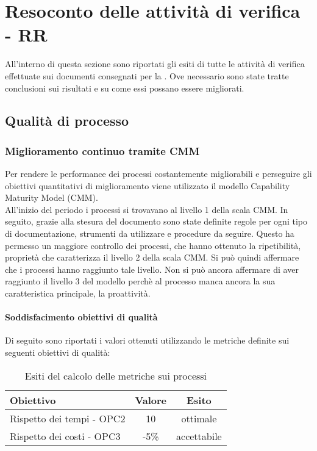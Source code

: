 \documentclass[PdQ.tex]{subfiles}
\begin{document}
\section{Resoconto delle attività di verifica - RR}
All'interno di questa sezione sono riportati gli esiti di tutte le attività di verifica effettuate sui documenti consegnati per la \RR{}. Ove necessario sono state tratte conclusioni sui risultati e su come essi possano essere migliorati.

\subsection{Qualità di processo}
		\subsubsection{Miglioramento continuo tramite CMM}
		Per rendere le performance dei processi costantemente migliorabili e perseguire gli obiettivi quantitativi di miglioramento viene utilizzato il modello Capability Maturity Model (CMM).\\
		All'inizio del periodo i processi si trovavano al livello 1 della scala CMM. In seguito, grazie alla stesura del documento \NPdocRR{} sono state definite regole per ogni tipo di documentazione, strumenti da utilizzare e procedure da seguire. Questo ha permesso un maggiore controllo dei processi, che hanno ottenuto la ripetibilità, proprietà che caratterizza il livello 2 della scala CMM. Si può quindi affermare che i processi hanno raggiunto tale livello. Non si può ancora affermare di aver raggiunto il livello 3 del modello perchè al processo manca ancora la sua caratteristica principale, la proattività.\\

		\paragraph{Soddisfacimento obiettivi di qualità}
			Di seguito sono riportati i valori ottenuti utilizzando le metriche definite sui seguenti obiettivi di qualità:
			\begin{table}[h]
				\centering
				\begin{tabular}{l c c}
					\hline
					\rule[-0.3cm]{0cm}{0.8cm}
					\textbf{Obiettivo} & \textbf{Valore} & \textbf{Esito} \\
					\hline
					\rule[0cm]{0cm}{0.4cm}
					Rispetto dei tempi - OPC2 & 10 & ottimale \\
					\rule[0cm]{0cm}{0.4cm}
					Rispetto dei costi - OPC3 & -5\% & accettabile\\ 
					
					\hline
				\end{tabular}
				\caption{Esiti del calcolo delle metriche sui processi}
			\end{table}
		
\end{document}
